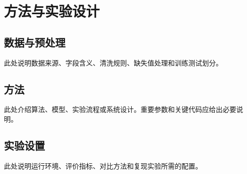 \chapter{方法与实验设计}

\section{数据与预处理}

此处说明数据来源、字段含义、清洗规则、缺失值处理和训练测试划分。

\section{方法}

此处介绍算法、模型、实验流程或系统设计。重要参数和关键代码应给出必要说明。

\section{实验设置}

此处说明运行环境、评价指标、对比方法和复现实验所需的配置。
